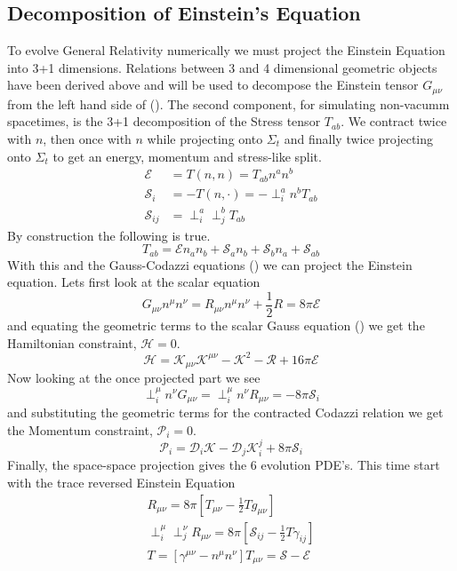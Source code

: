 \documentclass[11pt, oneside]{report}  %
\newcommand{\D}{\mathcal{D}}
\newcommand{\E}{\mathcal{E}}
\renewcommand{\S}{\mathcal{S}}
\newcommand{\K}{\mathcal{K}}
\newcommand{\R}{\mathcal{R}}
\numberwithin{equation}{section}
\begin{document}
\subsection{Decomposition of Einstein's Equation}
To evolve General Relativity numerically we must project the Einstein Equation into 3+1 dimensions. Relations between 3 and 4 dimensional geometric objects have been derived above and will be used to decompose the Einstein tensor $G_{\mu\nu}$ from the left hand side of (). The second component, for simulating non-vacumm spacetimes, is the 3+1 decomposition of the Stress tensor $T_{ab}$. We contract twice with $n$, then once with $n$ while projecting onto $\Sigma_t$ and finally twice projecting onto $\Sigma_t$ to get an energy, momentum and stress-like split.
\begin{align} \mathcal{E} &= T(n,n) = T_{ab}n^an^b\\
 \S_i &= -T(n,\cdot) = -\perp_i^a n^b T_{ab}\\
\S_{ij} &= \perp^a_i\perp^b_j T_{ab}\end{align}
By construction the following is true.
\begin{equation} T_{ab} = \mathcal{E} n_a n_b + \S_a n_b + \S_b n_a + \S_{ab}\end{equation}
With this and the Gauss-Codazzi equations () we can project the Einstein equation. Lets first look at the scalar equation
\begin{equation} G_{\mu\nu}n^\mu n^\nu = R_{\mu\nu}n^\mu n^\nu + \frac{1}{2}R = 8\pi \E\end{equation}
and equating the geometric terms to the scalar Gauss equation () we get the Hamiltonian constraint, $\mathcal{H}=0$.
\begin{equation}\mathcal{H} = \K_{\mu\nu}\K^{\mu\nu}-\K^2 -\R + 16\pi \E  \end{equation}
Now looking at the once projected part we see
\begin{equation} \perp^\mu_i n^\nu G_{\mu\nu} =  \perp^\mu_i n^\nu R_{\mu\nu} = -8\pi\S_i\end{equation}
and substituting the geometric terms for the contracted Codazzi relation we get the Momentum constraint, $\mathcal{P}_i = 0$.
\begin{equation} \mathcal{P}_i = \D_i \K - \D_j\K^j_i  + 8\pi \S_i\end{equation}
Finally, the space-space projection gives the 6 evolution PDE's. This time start with the trace reversed Einstein Equation
\begin{gather*} R_{\mu\nu} = 8 \pi \left[T_{\mu\nu} - \frac{1}{2}Tg_{\mu\nu}\right]\\
\perp^\mu_i\perp^\nu_jR_{\mu\nu} = 8 \pi \left[\S_{ij} - \frac{1}{2}T\gamma_{ij}\right]\\
T = \left[ \gamma^{\mu\nu} - n^\mu n^\nu\right]T_{\mu\nu} = \S-\E\end{gather*}
\end{document}
